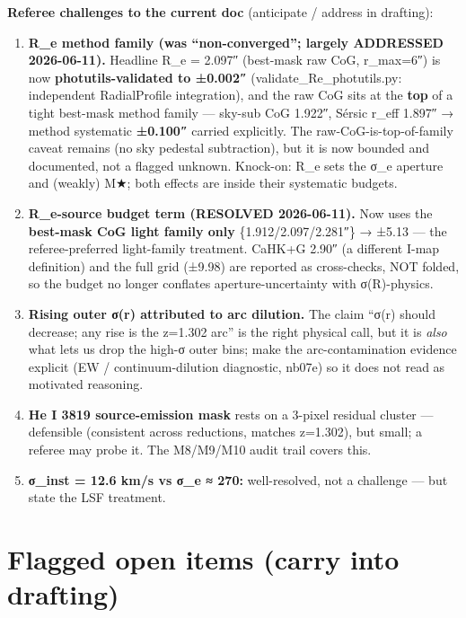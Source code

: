 \documentclass[
]{article}
\providecommand{\tightlist}{%
  \setlength{\itemsep}{0pt}\setlength{\parskip}{0pt}}
\newcommand{\BreakablePath}[1]{{\ttfamily\sloppy #1}}
\begin{document}
\textbf{Referee challenges to the current doc} (anticipate / address in
drafting):

\begin{enumerate}
\def\labelenumi{\arabic{enumi}.}
\tightlist
\item
  \textbf{R\_e method family (was ``non-converged''; largely ADDRESSED
  2026-06-11).} Headline R\_e = 2.097″ (best-mask raw CoG, r\_max=6″) is
  now \textbf{photutils-validated to ±0.002″}
  (\BreakablePath{validate\_\discretionary{}{}{}Re\_\discretionary{}{}{}photutils.\discretionary{}{}{}py}:
  independent \BreakablePath{RadialProfile} integration), and the raw
  CoG sits at the \textbf{top} of a tight best-mask method family ---
  sky-sub CoG 1.922″, Sérsic r\_eff 1.897″ → method systematic
  \textbf{±0.100″} carried explicitly. The raw-CoG-is-top-of-family
  caveat remains (no sky pedestal subtraction), but it is now bounded
  and documented, not a flagged unknown. Knock-on: R\_e sets the σ\_e
  aperture and (weakly) M★; both effects are inside their systematic
  budgets.
\item
  \textbf{R\_e-source budget term (RESOLVED 2026-06-11).} Now uses the
  \textbf{best-mask CoG light family only} \{1.912/2.097/2.281″\} →
  ±5.13 --- the referee-preferred light-family treatment. CaHK+G 2.90″
  (a different I-map definition) and the full grid (±9.98) are reported
  as cross-checks, NOT folded, so the budget no longer conflates
  aperture-uncertainty with σ(R)-physics.
\item
  \textbf{Rising outer σ(r) attributed to arc dilution.} The claim
  ``σ(r) should decrease; any rise is the z=1.302 arc'' is the right
  physical call, but it is \emph{also} what lets us drop the high-σ
  outer bins; make the arc-contamination evidence explicit (EW /
  continuum-dilution diagnostic, nb07e) so it does not read as motivated
  reasoning.
\item
  \textbf{He I 3819 source-emission mask} rests on a 3-pixel residual
  cluster --- defensible (consistent across reductions, matches
  z=1.302), but small; a referee may probe it. The M8/M9/M10 audit trail
  covers this.
\item
  \textbf{σ\_inst = 12.6 km/s vs σ\_e ≈ 270:} well-resolved, not a
  challenge --- but state the LSF treatment.
\end{enumerate}

\hypertarget{flagged-open-items-carry-into-drafting}{%
\section{Flagged open items (carry into
drafting)}\label{flagged-open-items-carry-into-drafting}}
\end{document}
